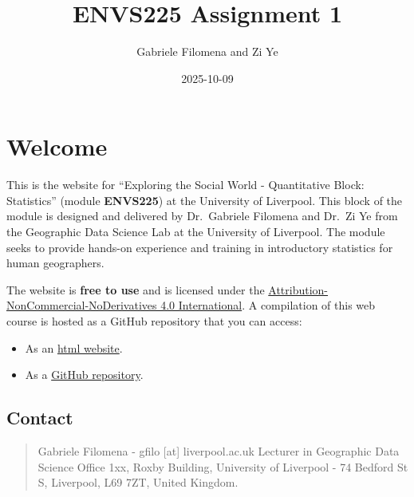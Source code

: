 \documentclass[
  letterpaper,
  DIV=11,
  numbers=noendperiod]{scrreprt}
\title{ENVS225 Assignment 1}
\author{Gabriele Filomena and Zi Ye}
\date{2025-10-09}
\providecommand{\tightlist}{%
  \setlength{\itemsep}{0pt}\setlength{\parskip}{0pt}}\usepackage{longtable,booktabs,array}
\renewcommand*\contentsname{Table of contents}
\newcommand\contentsname{Table of contents}
\begin{document}
\maketitle

\renewcommand*\contentsname{Table of contents}
{
\hypersetup{linkcolor=}
\setcounter{tocdepth}{2}
\tableofcontents
}


\chapter*{Welcome}\label{welcome}


This is the website for ``Exploring the Social World - Quantitative
Block: Statistics'' (module \textbf{ENVS225}) at the University of
Liverpool. This block of the module is designed and delivered by
Dr.~Gabriele Filomena and Dr.~Zi Ye from the Geographic Data Science Lab
at the University of Liverpool. The module seeks to provide hands-on
experience and training in introductory statistics for human
geographers.

The website is \textbf{free to use} and is licensed under the
\href{https://creativecommons.org/licenses/by-nc-nd/4.0/}{Attribution-NonCommercial-NoDerivatives
4.0 International}. A compilation of this web course is hosted as a
GitHub repository that you can access:

\begin{itemize}
\tightlist
\item
  As an \href{https://gdsl-ul.github.io/stats}{html website}.
\item
  As a \href{https://github.com/GDSL-UL/stats}{GitHub repository}.
\end{itemize}

\section*{Contact}\label{contact}


\begin{quote}
Gabriele Filomena - gfilo {[}at{]} liverpool.ac.uk Lecturer in
Geographic Data Science Office 1xx, Roxby Building, University of
Liverpool - 74 Bedford St S, Liverpool, L69 7ZT, United Kingdom.
\end{quote}
\end{document}
